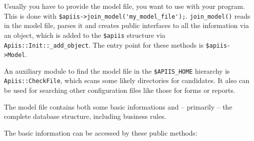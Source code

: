
Usually you have to provide the model file, you
want to use with your \apiis{} program. This is done with
\verb+$apiis->join_model('my_model_file');+.
\verb+join_model()+ reads in
the model file, parses it and creates public interfaces to all the
information via an object, which is added to the \verb+$apiis+ structure
via \verb+Apiis::Init::_add_object+.
The entry point for these methods is
\verb+$apiis->Model+.

An auxiliary module to find the model file in the \verb+$APIIS_HOME+
hierarchy is \verb+Apiis::CheckFile+,
which scans some likely directories for candidates. It also can be used for searching
other configuration files like those for forms or reports.

The model file contains both some basic informations and -- primarily --
the complete database structure, including business rules.

The basic information can be accessed by these public
methods:

